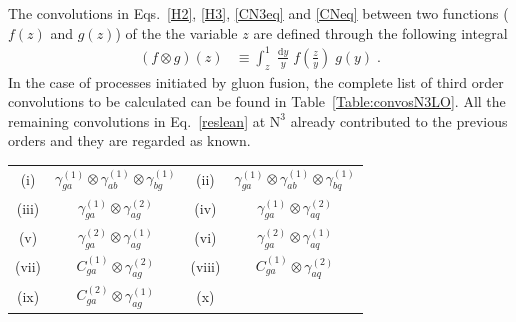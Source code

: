 \documentclass[12pt]{article}
\DeclareRobustCommand{\rd}{\ensuremath{\mathrm{d}}}
\DeclareRobustCommand{\LO}{\text{LO}\xspace}
\DeclareRobustCommand{\N}[1]{\ensuremath{\text{N}^{#1}}} %
\begin{document}
\begin{appendix}
The convolutions in Eqs.~\eqref{H2}, \eqref{H3}, \eqref{CN3eq} and \eqref{CNeq} between two functions ($f(z)$ and $g(z)$) of the the variable $z$ are defined through the following integral
\begin{align}
  \left( f \otimes g \right)(z) &\equiv \int^{1}_{z} \; \frac{\rd y}{y} \; f\left(\frac{z}{y}\right) \; g(y) \;.
\end{align}
In the case of processes initiated by gluon fusion, the complete list of third order convolutions to be calculated can be found in Table~\ref{Table:convosN3LO}. All the remaining convolutions in Eq.~\eqref{reslean} at \N3\LO already  contributed to the previous orders and they are regarded as known.

\begin{table}
\centering
\renewcommand{\arraystretch}{1.5}
\begin{tabular}{ |c|c||c|c| }
\hline
\multirow{1}{*}{(i)} 

& $\gamma^{(1)}_{ga}\otimes\gamma^{(1)}_{a b}\otimes\gamma^{(1)}_{bg}$

& \multirow{1}{*}{(ii)} 

& $\gamma^{(1)}_{ga}\otimes\gamma^{(1)}_{ab}\otimes\gamma^{(1)}_{bq}$  \\


\multirow{1}{*}{(iii)} 

& $\gamma^{(1)}_{ga}\otimes\gamma^{(2)}_{ag}$

& \multirow{1}{*}{(iv)} 

& $\gamma^{(1)}_{ga}\otimes\gamma^{(2)}_{aq}$  \\

\multirow{1}{*}{(v)} 

& $\gamma^{(2)}_{ga}\otimes\gamma^{(1)}_{ag}$

& \multirow{1}{*}{(vi)} 

& $\gamma^{(2)}_{ga}\otimes\gamma^{(1)}_{aq}$  \\

\multirow{1}{*}{(vii)} 

& $C^{(1)}_{ga}\otimes\gamma^{(2)}_{ag}$

& \multirow{1}{*}{(viii)} 

& $C^{(1)}_{ga}\otimes\gamma^{(2)}_{aq}$  \\

\multirow{1}{*}{(ix)} 

& $C^{(2)}_{ga}\otimes\gamma^{(1)}_{ag}$

& \multirow{1}{*}{(x)} 


\end{tabular}
\end{table}
\end{appendix}
\end{document}
